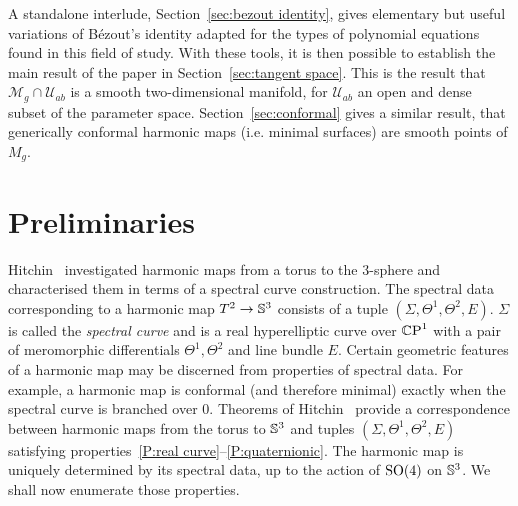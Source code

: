 \documentclass{article}
\begin{document}
A standalone interlude, Section~\ref{sec:bezout identity}, gives elementary but useful variations of B\'ezout's identity adapted for the types of polynomial equations found in this field of study. With these tools, it is then possible to establish the main result of the paper in Section~\ref{sec:tangent space}. This is the result that $\mathcal{M}_g\cap\mathcal{U}_{ab}$ is a smooth two-dimensional manifold, for $\mathcal{U}_{ab}$ an open and dense subset of the parameter space.
Section~\ref{sec:conformal} gives a similar result, that generically conformal harmonic maps (i.e. minimal surfaces) are smooth points of $M_g$.








\section{Preliminaries}\label{sec:preliminaries}
Hitchin~\cite{Hitchin1990} investigated harmonic maps from a torus to the $3$-sphere and characterised them in terms of a spectral curve construction. The spectral data corresponding to a harmonic map $T^2 \to \S^3$ consists of a tuple $(\Sigma, \Theta^1, \Theta^2, E)$. $\Sigma$ is called the \emph{spectral curve} and is a real hyperelliptic curve over $\CP^1$ with a pair of meromorphic differentials $\Theta^1,\Theta^2$ and line bundle $E$. Certain geometric features of a harmonic map may be discerned from properties of spectral data. For example, a harmonic map is conformal (and therefore minimal) exactly when the spectral curve is branched over $0$. Theorems of Hitchin~\cite[Theorems~8.1,~8.20]{Hitchin1990} provide a correspondence between harmonic maps from the torus to $\S^3$ and tuples $(\Sigma,\Theta^1,\Theta^2,E)$ satisfying properties~\ref{P:real curve}--\ref{P:quaternionic}. The harmonic map is uniquely determined by its spectral data, up to the action of $\SO(4)$ on $\S^3$. We shall now enumerate those properties.
\end{document}
